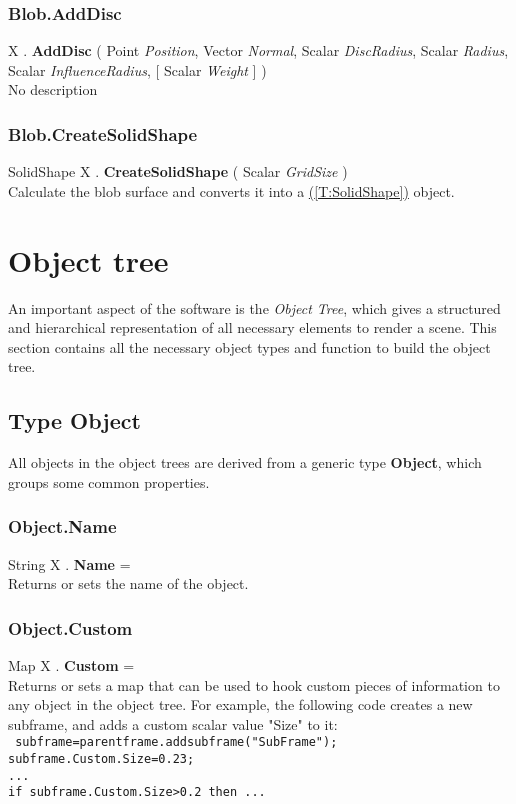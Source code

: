 \documentclass[10pt]{book}
\newcommand{\linkitem}[1]{\hyperref[#1]{\nameref{#1} (\ref{#1})}}
\newcommand{\sourcecode}[1]{\texttt{#1}}
\begin{document}
\subsubsection{Blob.AddDisc \label{F:Blob:AddDisc}}
X . \textbf{AddDisc} ( Point \textit{Position}, Vector \textit{Normal}, Scalar \textit{DiscRadius}, Scalar \textit{Radius}, Scalar \textit{InfluenceRadius},  [ Scalar \textit{Weight} ] ) \\
No description

\subsubsection{Blob.CreateSolidShape \label{F:Blob:CreateSolidShape}}
SolidShape X . \textbf{CreateSolidShape} ( Scalar \textit{GridSize} ) \\
Calculate the blob surface and converts it into a \linkitem{T:SolidShape} object.

\section{Object tree \label{Object tree}}
An important aspect of the software is the \textit{Object Tree}, which gives a structured and hierarchical representation of all necessary elements to render a scene. This section contains all the necessary object types and function to build the object tree.

\subsection{Type Object \label{T:Object}}
All objects in the object trees are derived from a generic type \textbf{Object}, which groups some common properties.

\subsubsection{Object.Name \label{F:Object:Name}}
String X . \textbf{Name} = \\
Returns or sets the name of the object.

\subsubsection{Object.Custom \label{F:Object:Custom}}
Map X . \textbf{Custom} = \\
Returns or sets a map that can be used to hook custom pieces of information to any object in the object tree. For example, the following code creates a new subframe, and adds a custom scalar value "Size" to it: \\
\sourcecode{
subframe=parentframe.addsubframe("SubFrame"); \\
subframe.Custom.Size=0.23; \\
... \\
if subframe.Custom.Size>0.2 then ... \\
}
\end{document}

